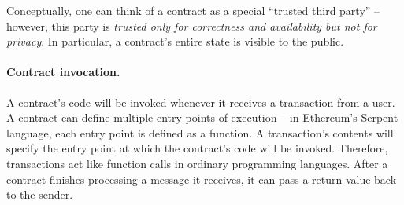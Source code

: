 \documentclass{llncs}
\newcommand{\ignore}[1]{}
\begin{document}
Conceptually, one can think of a contract as 
a special ``trusted third party'' -- however,
this party is {\it trusted only for correctness and availability but not for privacy}.
In particular, a contract's entire state is 
visible to the public.

\paragraph{Contract invocation.} 
A contract's code will be invoked 
whenever it receives a transaction from a user.
A contract can define multiple entry points
of execution -- in Ethereum's Serpent language,
each entry point is defined as a function.
A transaction's contents
will specify the entry point 
at which the contract's code will be invoked.
Therefore, transactions act like function calls in ordinary programming languages. 
After a contract finishes processing a message it receives, it can pass a return value back to the sender.






\ignore{
\paragraph{Transactions, Messages and Gas.}
A transaction always begins with a message from a user to some recipient address (either another user or a contract). This message must be signed by the user, and can contain data, ether, or both. If the recipient is a contract, then the code of that contract is executed. If that code contains an instruction to send a message to another contract, then that contract's code is executed next. So, a transaction must contain at least one message, but can trigger several messages before it completes.

Messages act a bit like function calls in ordinary programming languages. After a contract finishes processing a message it receives, it can pass a return value back to the sender.

In some cases, a contract can encounter an ``exception'' (e.g., because of an invalid instruction). After an exception, control is also returned to the sender along with a special return code. The state of \emph{all} contract, including account balances and storage, is reverted to what it was just prior to calling the exception-causing message.
}
\end{document}

